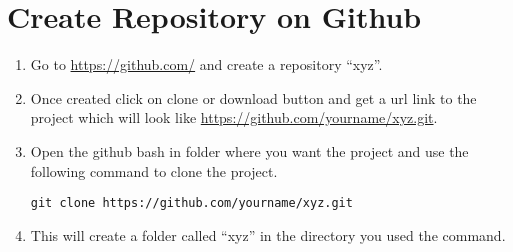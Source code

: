 \documentclass[paper=a4, fontsize=12pt]{scrartcl}
\begin{document}
\section*{Create Repository on Github}
\begin{enumerate}
\item Go to \url{https://github.com/} and create a repository ``xyz''.
\item Once created click on clone or download button and get a url link to the project which will look like \url{https://github.com/yourname/xyz.git}.
\item Open the github bash in folder where you want the project and use the following command to clone the project.
\begin{lstlisting}
git clone https://github.com/yourname/xyz.git
\end{lstlisting}
\item This will create a folder called ``xyz'' in the directory you used the command.


\end{enumerate}
\end{document}
